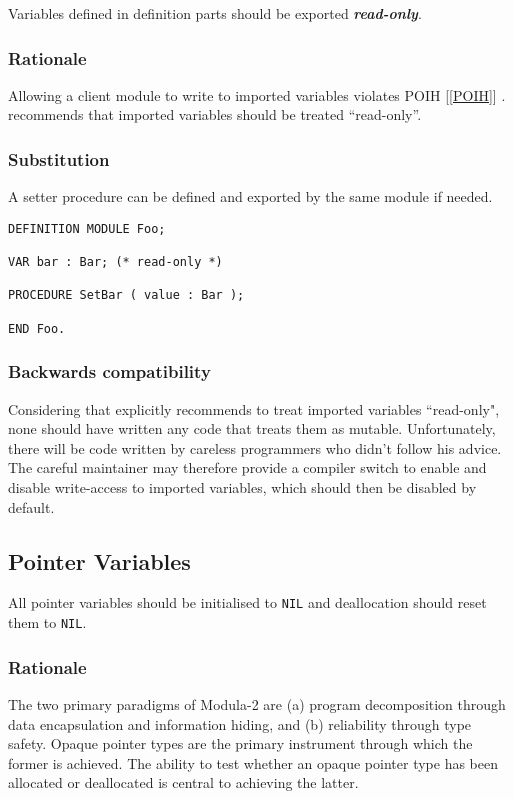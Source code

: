 \documentclass[10pt,a4paper]{article}
\renewcommand{\emph}[1]{\textbf{\textit{#1}}}
\begin{document}
Variables defined in definition parts should be exported \emph{read-only}. 

\subsubsection{Rationale}

Allowing a client module to write to imported variables violates POIH
[\ref{POIH}] \cite{Parnas72}. \cite{Wirth88} recommends that imported
variables should be treated ``read-only''.

\subsubsection{Substitution}

A setter procedure can be defined and exported by the same module if needed.

\lstset{style=modula2}
\begin{lstlisting}
DEFINITION MODULE Foo;

VAR bar : Bar; (* read-only *)

PROCEDURE SetBar ( value : Bar );

END Foo.
\end{lstlisting}

\subsubsection{Backwards compatibility}

Considering that \cite{Wirth88} explicitly recommends to treat imported
variables ``read-only", none should have written any code that treats them
as mutable. Unfortunately, there will be code written by careless programmers
who didn't follow his advice. The careful maintainer may therefore provide a
compiler switch to enable and disable write-access to imported variables,
which should then be disabled by default.


\subsection{Pointer Variables}
All pointer variables should be initialised to \verb|NIL| and deallocation
should reset them to \verb|NIL|.

\subsubsection{Rationale}
The two primary paradigms of Modula-2 are (a) program decomposition through
data encapsulation and information hiding, and (b) reliability through type
safety. Opaque pointer types are the primary instrument through which the
former is achieved. The ability to test whether an opaque pointer type has
been allocated or deallocated is central to achieving the latter.
\end{document}
